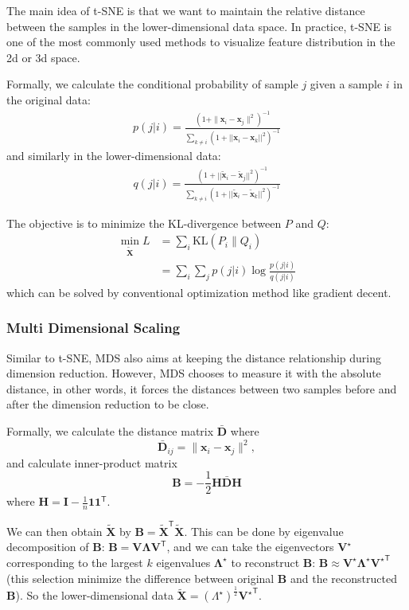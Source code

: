 \documentclass[journal]{IEEEtran}
\begin{document}
The main idea of t-SNE is that we want to maintain the relative distance between the samples in the lower-dimensional data space. In practice, t-SNE is one of the most commonly used methods to visualize feature distribution in the 2d or 3d space.

Formally, we calculate the conditional probability of sample $j$ given a sample $i$ in the original data:
\begin{align*}
p(j|i) = \frac{(1+\|\mathbf x_i-\mathbf x_j\|^2)^{-1}}{\sum_{k\neq i}(1+||\mathbf x_i-\mathbf x_k||^2)^{-1}}
\end{align*}
and similarly in the lower-dimensional data:
\begin{align*}
q(j|i)=\frac{(1+||\tilde{\mathbf x}_i-\tilde{\mathbf x}_j||^2)^{-1}}{\sum_{k\neq i}(1+||\tilde{\mathbf x}_i-\tilde{\mathbf x}_k||^2)^{-1}}
\end{align*}

The objective is to minimize the KL-divergence between $P$ and $Q$:
\begin{align*}
    \min_{\tilde{\mathbf X}} L &=\sum_i \mathrm{KL}(P_i\|Q_i) \\
    &=\sum_i\sum_j p(j|i) \log\frac{p(j|i)}{q(j|i)}
\end{align*}
which can be solved by conventional optimization method like gradient decent.

\subsubsection{Multi Dimensional Scaling }
Similar to t-SNE, MDS also aims at keeping the distance relationship during dimension reduction. However, MDS chooses to measure it with the absolute distance, in other words, it forces the distances between two samples before and after the dimension reduction to be close.

Formally, we calculate the distance matrix $\mathbf{\bar D}$ where
$$
\mathbf{\bar D}_{ij}=\|\mathbf x_i-\mathbf x_j\|^2,
$$
and calculate inner-product matrix 
$$
\mathbf{B}=-\frac{1}{2}\mathbf{H\bar D H}
$$
where $\mathbf{H}=\mathbf I - \frac{1}{n}\mathbf{11}^\mathsf{T}$.

We can then obtain $\mathbf{\tilde{X}}$ by $\mathbf{B} =\mathbf{\tilde{X}^\mathsf{T}\tilde{X}}$. This can be done by eigenvalue decomposition of $\mathbf{B}$:  $\mathbf B = \mathbf{V\Lambda V^\mathsf{T}}$, and we can take the eigenvectors $\mathbf{V^\star}$ corresponding to the largest $k$ eigenvalues $\mathbf{\Lambda^\star}$ to reconstruct $\mathbf B$: $\mathbf{B}\approx \mathbf{V^\star \Lambda^\star {V^\star}^\mathsf{T}}$ (this selection minimize the difference between original $\mathbf B$ and the reconstructed $\mathbf B$). So the lower-dimensional data $\mathbf{\tilde{X}}=(\Lambda^\star)^{\frac{1}{2}} \mathbf {V^\star}^\mathsf{T}$.
\end{document}
